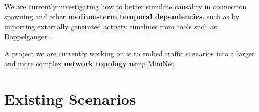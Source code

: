 \documentclass[runningheads]{llncs}
\begin{document}
We are currently investigating how to better simulate causality in connection spawning and other \textbf{medium-term temporal dependencies}, such as by importing externally generated activity timelines from tools such as Doppelganger \cite{lin2019generating}. 

A project we are currently working on is to embed traffic scenarios into a larger and more complex \textbf{network topology} using MiniNet.









 


\appendix


\section{Existing Scenarios}\label{Sec:ExistScen}
\end{document}
